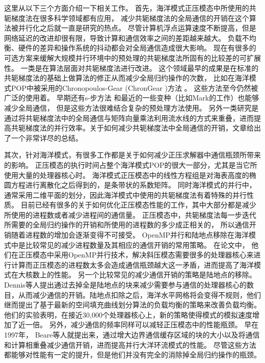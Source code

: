 这里从以下三个方面介绍一下相关工作。
首先，海洋模式正压模态中所使用的共轭梯度法在很多科学领域都有应用，
减少共轭梯度法的全局通信的开销在这个算法被并行化之后就一直是研究的热点。 
尽管计算机浮点运算速度不断提高，但是网络延迟的改进却很有限，导致计算和通信效率之间的差距越来越大。
负载不均衡、硬件的差异和操作系统的抖动都会对全局通信造成很大影响\cite{ghysels2014}。 
现在有很多的可选方案来缓解大规模并行环境中的预处理的共轭梯度法所固有的比较差的可扩展性。
一类是在算法层面对共轭梯度法进行改进。 
这个领域最早的成果是在标准的共轭梯度法的基础上做算法的修正从而减少全局归约操作的次数， 比如在海洋模式POP中被采用的Chronopoulos-Gear (ChronGear \cite{dAzevedo1999lapack})方法 。 这些方法至今仍然被广泛的使用着。 
早期还有s-步方法\cite{chron1989} 和最近的一些变种（比如Mark的工作\cite{hoemmen2010}）也能够减少全局通信， 但是这些方法很难结合复杂的预处理方法使用。
另外一类研究是通过将共轭梯度法中的全局通信与矩阵向量乘法利用流水线的方式来重叠，进而提高共轭梯度法的并行效率。关于如何减少共轭梯度法中全局通信的开销，文章给出了一个非常详尽的总结。
 



其次，针对海洋模式，有很多工作都是关于如何减少正压求解器中通信瓶颈所带来的影响。
正压模态的执行时间占整个海洋模式POP的很大一部分，尤其是当它所使用大量的处理器核心时。
海洋模式正压模态中的线性方程组是对海表高度的椭圆方程进行离散化之后得到的，是条带状的系数矩阵。
同时海洋模式的并行中，通常采用二维平面的划分，因此海洋模式中使用的共轭梯度法有着特殊的并行性质。
目前已经有很多的关于如何优化正压模态性能的工作，其中大部分都是减少所使用的进程数或者减少进程间的通信量。 
正压模态中，共轭梯度法每一步迭代所需要的全局归约操作的开销和所使用的进程数的多少成正相关的， 所以通信开销随着进程数的增加会逐渐变得不可接受。
OpenMP并行和陆地点移除在海洋模式中是比较常见的减少进程数量及其相应的通信开销的常用策略。  
在论文中， 他们在正压模态中采用OpenMP并行技术，解决斜压模态需要很多的处理器核心来进行计算而正压模态的进程数太多会造成通信瓶颈越大这一矛盾，进而提高了海洋模式在大核数上的性能。 
另一个比较常见的减少通信开销的策略是陆地点的移除\cite{dennis2007inverse,dennis2008scaling}。 
Dennis等人提出通过去掉全是陆地点的块来减少需要参与通信的处理器核心的数目，从而减少通信的开销。陆地点扣除之后，海洋水平网格将会变得不规则，他们继而提出了基于最新的空间填充曲线划分算法的负载均衡的策略来改善负载均衡。 
他们的实验表明，在接近30,000个处理器核心上，新的策略使得模式的模拟速度增加了近一倍。 
另外，减少通信的频率同样可以减轻正压模态中的性能瓶颈。 
早在1997年，  Beare\cite{beare1997optimisation}等人就提出来，通过增大边界通信缓存区域的块的大小以及将通信和计算相重叠减少通信开销，进而提高并行大洋环流模式的性能。  
尽管这些方法都能够对性能有一定的提升，但是他们并没有完全的消除掉全局归约操作的瓶颈。 

